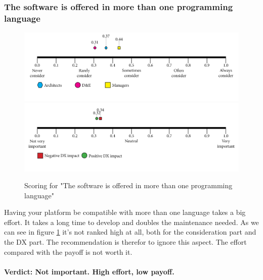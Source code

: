 \documentclass{article}
\begin{document}
\subsubsection{The software is offered in more than one programming language}
\begin{figure}[H]
\centering
\includegraphics[width=\linewidth]{scorelines/aspect13.png}
\includegraphics[width=\linewidth]{dxscorelines/dxaspect13.png}
\caption{Scoring for "The software is offered in more than one programming language"}
\label{fig:aspect13}
\end{figure}
Having your platform be compatible with more than one language takes a big effort. It takes a long time to develop and doubles the maintenance needed. As we can see in figure \ref{fig:aspect13} it's not ranked high at all, both for the consideration part and the DX part. The recommendation is therefor to ignore this aspect. The effort compared with the payoff is not worth it. \\ \\
\textbf{Verdict: Not important. High effort, low payoff.}
\end{document}
